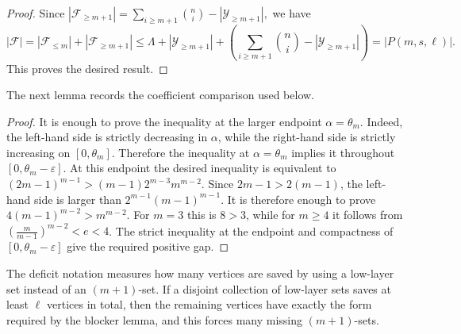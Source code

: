 \documentclass[10pt,a4paper]{article}
\numberwithin{equation}{section}
\newtheorem{lemma}[lemma]{Lemma}
\theoremstyle{definition}
\newcommand{\F}{\mathcal F}
\newcommand{\Y}{\mathcal Y}
\newcommand{\eps}{\varepsilon}
\begin{document}
\begin{proof}
    Since
    \(|\F_{\ge m+1}|= \sum_{i\ge m+1}\binom ni-|\Y_{\ge m+1}|,\)
    we have
    \[
        |\F| =|\F_{\le m}|+|\F_{\ge m+1}|  \le
        \Lambda+|\Y_{\ge m+1}|+
        \left(\sum_{i\ge m+1}\binom ni-|\Y_{\ge m+1}|\right) =|P(m,s,\ell)|.
    \]
    This proves the desired result.
\end{proof}


The next lemma records the coefficient comparison used below.

\begin{proof}
    It is enough to prove the inequality at the larger endpoint
    $\alpha=\theta_m$.  Indeed, the left-hand side is strictly decreasing in
    $\alpha$, while the right-hand side is strictly increasing on
    $[0,\theta_m]$.  Therefore the inequality at $\alpha=\theta_m$ implies it
    throughout $[0,\theta_m-\eps]$.
    At this endpoint the desired inequality is equivalent to
    \((2m-1)^{m-1}>(m-1)2^{m-3}m^{m-2}.\)
    Since $2m-1>2(m-1)$, the left-hand side is larger than
    $2^{m-1}(m-1)^{m-1}$.  It is therefore enough to prove
    \(4(m-1)^{m-2}>m^{m-2}.\)
    For $m=3$ this is $8>3$, while for $m\ge4$ it follows from $\left(\frac{m}{m-1}\right)^{m-2}<e<4$.
    The strict inequality at the endpoint
    and compactness of $[0,\theta_m-\eps]$ give the required positive gap.
\end{proof}


The deficit notation measures how many vertices are saved by using a low-layer set instead of an $(m+1)$-set.
If a disjoint collection of low-layer sets saves at least $\ell$ vertices in total, then the remaining vertices have exactly the form required by the blocker lemma, and this forces many missing $(m+1)$-sets.

\end{document}
